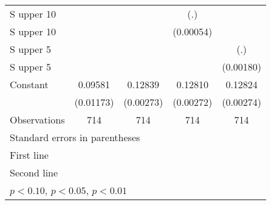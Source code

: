 \begin{table}[htbp]
\begin{tabular}{l*{4}{c}}
\addlinespace
S upper 10%
                    &                     &                     &         (.)         &                     \\
\addlinespace
S upper 10%
                    &                     &                     &   (0.00054)         &                     \\
\addlinespace
S upper 5%
                    &                     &                     &                     &         (.)         \\
\addlinespace
S upper 5%
                    &                     &                     &                     &   (0.00180)         \\
\addlinespace
Constant            &     0.09581\sym{***}&     0.12839\sym{***}&     0.12810\sym{***}&     0.12824\sym{***}\\
                    &   (0.01173)         &   (0.00273)         &   (0.00272)         &   (0.00274)         \\
\midrule
Observations        &         714         &         714         &         714         &         714         \\
\bottomrule
\multicolumn{5}{l}{\footnotesize Standard errors in parentheses}\\
\multicolumn{5}{l}{\footnotesize First line}\\
\multicolumn{5}{l}{\footnotesize Second line}\\
\multicolumn{5}{l}{\footnotesize \sym{*} \(p<0.10\), \sym{**} \(p<0.05\), \sym{***} \(p<0.01\)}\\
\end{tabular}
\end{table}
